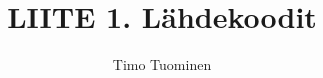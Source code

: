 \documentclass[a4paper,12pt]{article}
\title{LIITE 1. Lähdekoodit}
\date{}
\author{Timo Tuominen}
\begin{document}
\maketitle{}

\renewcommand{\theFancyVerbLine}{
  \sffamily\textcolor[rgb]{0.5,0.5,0.5}{\scriptsize\arabic{FancyVerbLine}}}

\renewcommand*\contentsname{Tiedostot}
\tableofcontents
\end{document}
